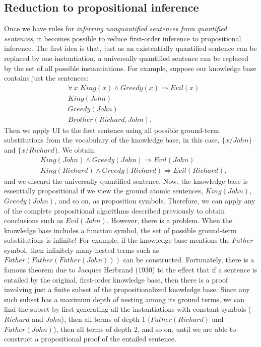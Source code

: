 \subsection{Reduction to propositional inference}
Once we have rules for \textit{inferring nonquantified sentences from quantified sentences}, it becomes possible to reduce first-order inference to propositional inference.\newline\newline
The first idea is that, just as an existentially quantified sentence can be replaced by one instantiation, a universally quantified sentence can be replaced by the set of all possible instantiations. For example, suppose our knowledge base contains just the sentences:
\[
\begin{split}
    & \forall \, x \,\, King(x) \land Greedy(x) \Rightarrow Evil(x)\\
    & King(John)\\
    & Greedy(John)\\
    & Brother (Richard, John).
\end{split}
\]
Then we apply UI to the first sentence using all possible ground-term substitutions from the vocabulary of the knowledge base, in this case, $\{x/John\}$ and $\{x/Richard\}$. We obtain:
\[
\begin{split}
    & King(John) \land Greedy(John) \Rightarrow Evil(John)\\
    & King(Richard) \land Greedy(Richard) \Rightarrow Evil(Richard),
\end{split}
\]
and we discard the universally quantified sentence. Now, the knowledge base is essentially propositional if we view the ground atomic sentences, $King (John)$, $Greedy(John)$, and so on, as proposition symbols. Therefore, we can apply any of the complete propositional
algorithms described previously to obtain conclusions such as $Evil(John)$.\newline\newline
However, there is a problem. When the knowledge base includes
a function symbol, the set of possible ground-term substitutions is infinite! For example, if the knowledge base mentions the $Father$ symbol, then infinitely many nested terms such as $Father (Father (Father (John)))$ can be constructed.\newline\newline
Fortunately, there is a famous theorem due to Jacques Herbrand (1930) to the effect that if a sentence is entailed by the original, first-order knowledge base, then there is a proof involving just a finite subset of the propositionalized knowledge base. Since any such subset has a maximum depth of nesting among its ground terms, we can find the subset by first generating all the instantiations with constant symbols ($Richard$ and $John$), then all terms of depth 1 ($Father (Richard)$ and $Father (John)$), then all terms of depth 2, and so on, until we are able to construct a propositional proof of the entailed sentence.\newline\newline
